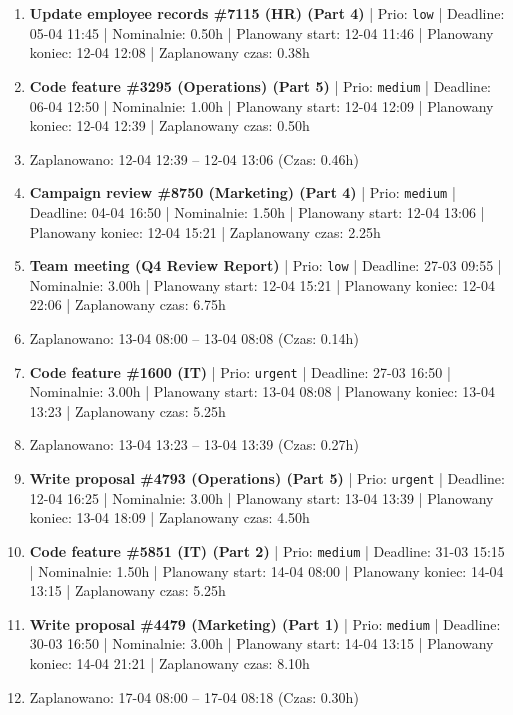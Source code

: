 {\begin{enumerate}
  \item [\textbf{14701}] \textbf{Update employee records \#7115 (HR) (Part 4)} | Prio: \texttt{low} | Deadline: 05-04 11:45 | Nominalnie: 0.50h | Planowany start: 12-04 11:46 | Planowany koniec: 12-04 12:08 | Zaplanowany czas: 0.38h
  \item [\textbf{14645}] \textbf{Code feature \#3295 (Operations) (Part 5)} | Prio: \texttt{medium} | Deadline: 06-04 12:50 | Nominalnie: 1.00h | Planowany start: 12-04 12:09 | Planowany koniec: 12-04 12:39 | Zaplanowany czas: 0.50h
  \item [\textbf{PRZERWA}] Zaplanowano: 12-04 12:39 -- 12-04 13:06 (Czas: 0.46h)
  \item [\textbf{14632}] \textbf{Campaign review \#8750 (Marketing) (Part 4)} | Prio: \texttt{medium} | Deadline: 04-04 16:50 | Nominalnie: 1.50h | Planowany start: 12-04 13:06 | Planowany koniec: 12-04 15:21 | Zaplanowany czas: 2.25h
  \item [\textbf{14682}] \textbf{Team meeting (Q4 Review Report)} | Prio: \texttt{low} | Deadline: 27-03 09:55 | Nominalnie: 3.00h | Planowany start: 12-04 15:21 | Planowany koniec: 12-04 22:06 | Zaplanowany czas: 6.75h
  \item [\textbf{PRZERWA}] Zaplanowano: 13-04 08:00 -- 13-04 08:08 (Czas: 0.14h)
  \item [\textbf{14605}] \textbf{Code feature \#1600 (IT)} | Prio: \texttt{urgent} | Deadline: 27-03 16:50 | Nominalnie: 3.00h | Planowany start: 13-04 08:08 | Planowany koniec: 13-04 13:23 | Zaplanowany czas: 5.25h
  \item [\textbf{PRZERWA}] Zaplanowano: 13-04 13:23 -- 13-04 13:39 (Czas: 0.27h)
  \item [\textbf{14600}] \textbf{Write proposal \#4793 (Operations) (Part 5)} | Prio: \texttt{urgent} | Deadline: 12-04 16:25 | Nominalnie: 3.00h | Planowany start: 13-04 13:39 | Planowany koniec: 13-04 18:09 | Zaplanowany czas: 4.50h
  \item [\textbf{14643}] \textbf{Code feature \#5851 (IT) (Part 2)} | Prio: \texttt{medium} | Deadline: 31-03 15:15 | Nominalnie: 1.50h | Planowany start: 14-04 08:00 | Planowany koniec: 14-04 13:15 | Zaplanowany czas: 5.25h
  \item [\textbf{14660}] \textbf{Write proposal \#4479 (Marketing) (Part 1)} | Prio: \texttt{medium} | Deadline: 30-03 16:50 | Nominalnie: 3.00h | Planowany start: 14-04 13:15 | Planowany koniec: 14-04 21:21 | Zaplanowany czas: 8.10h
  \item [\textbf{PRZERWA}] Zaplanowano: 17-04 08:00 -- 17-04 08:18 (Czas: 0.30h)

\end{enumerate}}
